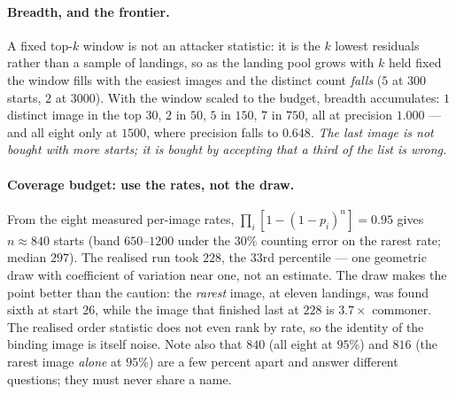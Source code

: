 \paragraph{Breadth, and the frontier.} A fixed top-$k$ window is not an attacker
statistic: it is the $k$ lowest residuals rather than a sample of landings, so
as the landing pool grows with $k$ held fixed the window fills with the easiest
images and the distinct count \emph{falls} ($5$ at $300$ starts, $2$ at $3000$).
With the window scaled to the budget, breadth accumulates: $1$ distinct image in
the top $30$, $2$ in $50$, $5$ in $150$, $7$ in $750$, all at precision
$1.000$ --- and all eight only at $1500$, where precision falls to $0.648$.
\emph{The last image is not bought with more starts; it is bought by accepting
that a third of the list is wrong.}

\paragraph{Coverage budget: use the rates, not the draw.} From the eight
measured per-image rates, $\prod_i[1-(1-p_i)^n]=0.95$ gives $n\approx840$ starts
(band $650$--$1200$ under the $30\%$ counting error on the rarest rate; median
$297$). The realised run took $228$, the $33$rd percentile --- one geometric
draw with coefficient of variation near one, not an estimate. The draw makes the
point better than the caution: the \emph{rarest} image, at eleven landings, was
found sixth at start $26$, while the image that finished last at $228$ is
$3.7\times$ commoner. The realised order statistic does not even rank by rate,
so the identity of the binding image is itself noise. Note also that $840$ (all
eight at $95\%$) and $816$ (the rarest image \emph{alone} at $95\%$) are a few
percent apart and answer different questions; they must never share a name.

